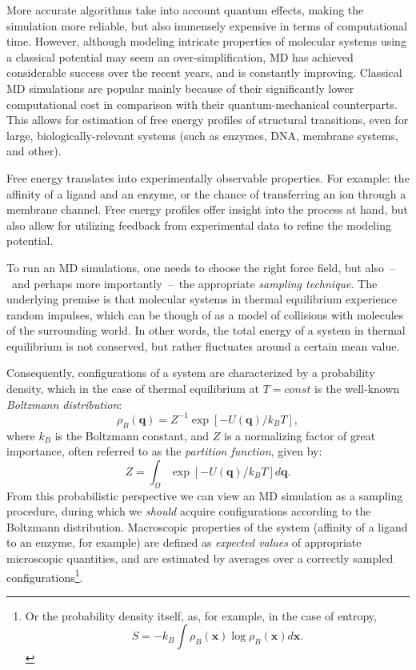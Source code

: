 More accurate algorithms take into account quantum effects, making the simulation more reliable, but also immensely expensive in terms of computational time.
However, although modeling intricate properties of molecular systems using a classical potential may seem an over-simplification, MD has achieved considerable success over the recent years, and is constantly improving.
Classical MD simulations are popular mainly because of their significantly lower computational cost in comparison with their quantum-mechanical counterparts.
This allows for estimation of free energy profiles of structural transitions, even for large, biologically-relevant systems (such as enzymes, DNA, membrane systems, and other).

Free energy translates into experimentally observable properties.
For example: the affinity of a ligand and an enzyme, or the chance of transferring an ion through a membrane channel.
Free energy profiles offer insight into the process at hand, but also allow for utilizing feedback from experimental data to refine the modeling potential.

To run an MD simulations, one needs to choose the right force field, but also~--~and perhaps more importantly~--~the appropriate \emph{sampling technique}.
The underlying premise is that molecular systems in thermal equilibrium experience random impulses, which can be though of as a model of collisions with molecules of the surrounding world.
In other words, the total energy of a system in thermal equilibrium is not conserved, but rather fluctuates around a certain mean value.

Consequently, configurations of a system are characterized by a probability density, which in the case of thermal equilibrium at $T=const$ is the well-known \emph{Boltzmann distribution}:
\begin{equation}
 \rho_B(\mathbf{q})=Z^{-1} \exp[-U(\mathbf{q})/k_BT],
\end{equation}
where $k_B$ is the Boltzmann constant, and $Z$ is a normalizing factor of great importance, often referred to as the \emph{partition function}, given by: $$Z=\int_\Omega \exp[-U(\mathbf{q})/k_BT] d\mathbf{q}.$$
From this probabilistic perspective we can view an MD simulation as a sampling procedure, during which we \emph{should} acquire configurations according to the Boltzmann distribution.
Macroscopic properties of the system (affinity of a ligand to an enzyme, for example) are defined as \emph{expected values} of appropriate microscopic quantities, and are estimated by averages over a correctly sampled configurations\footnote{Or the probability density itself, as, for example, in the case of entropy, $$S=-k_B \int \rho_B(\mathbf{x})\log\rho_B(\mathbf{x}) d\mathbf{x}.$$}.

